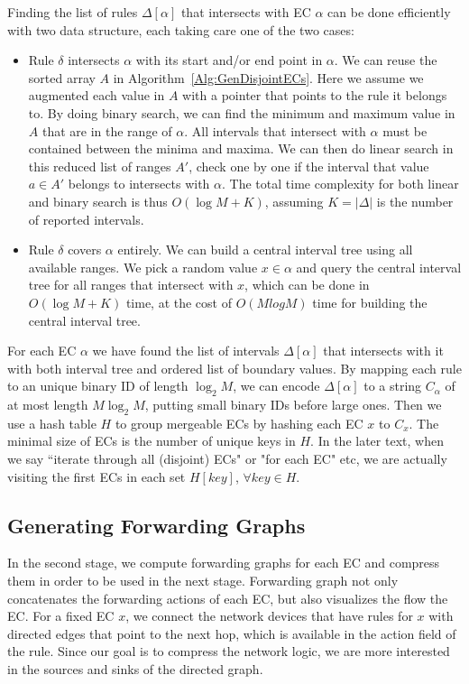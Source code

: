 Finding the list of rules $\Delta[\alpha]$ that intersects with EC $\alpha$ can be done
efficiently with two data structure,
each taking care one of the two cases\cite{FindIntersectionWiki}:
\begin{itemize}
\item Rule $\delta$ intersects $\alpha$ with its start and/or end point in $\alpha$.
        We can reuse the sorted array $A$ in Algorithm~\ref{Alg:GenDisjointECs}.
        Here we assume we augmented each value in $A$ with a pointer that points to
        the rule it belongs to.
        By doing binary search, we can find the minimum and maximum value in $A$ that
        are in the range of $\alpha$.
        All intervals that intersect with $\alpha$ must be contained between
        the minima and maxima.
        We can then do linear search in this reduced list of ranges $A'$,
        check one by one if the interval that value $a\in A'$ belongs to
        intersects with $\alpha$.
        The total time complexity for both linear and binary search is thus $O(\log M + K)$,
        assuming $K=|\Delta|$ is the number of reported intervals.
\item Rule $\delta$ covers $\alpha$ entirely. We can build
        a central interval tree\cite{ComputationalGeometryBook} using all available ranges.
        We pick a random value $x \in \alpha$ and query the central interval tree for
        all ranges that intersect with $x$, which can be done in $O(\log M + K)$ time,
        at the cost of $O(M log M)$ time for building the central interval tree. 
\end{itemize}

For each EC $\alpha$ we have found the list of intervals $\Delta[\alpha]$
that intersects with it with both interval tree and ordered list of boundary values.
By mapping each rule to an unique binary ID of length $\log_2 M$,
we can encode $\Delta[\alpha]$ to a string $C_\alpha$ of at most length $M\log_2 M$, putting
small binary IDs before large ones.
Then we use a hash table $H$ to group mergeable ECs by hashing each EC $x$ to $C_x$.
The minimal size of ECs is the number of unique keys in $H$.
In the later text, when we say ``iterate through all (disjoint) ECs" or "for each EC" etc,
we are actually visiting the first ECs in each set $H[key]$, $\forall key \in H$.


\subsection{Generating Forwarding Graphs}
In the second stage, we compute forwarding graphs for each EC and
compress them in order to be used in the next stage.
Forwarding graph not only concatenates the forwarding actions of each EC,
but also visualizes the flow the EC.
For a fixed EC $x$, we connect the network devices that have rules for $x$
with directed edges that point to the next hop,
which is available in the action field of the rule.
Since our goal is to compress the network logic, we are more interested in the sources
and sinks of the directed graph.

